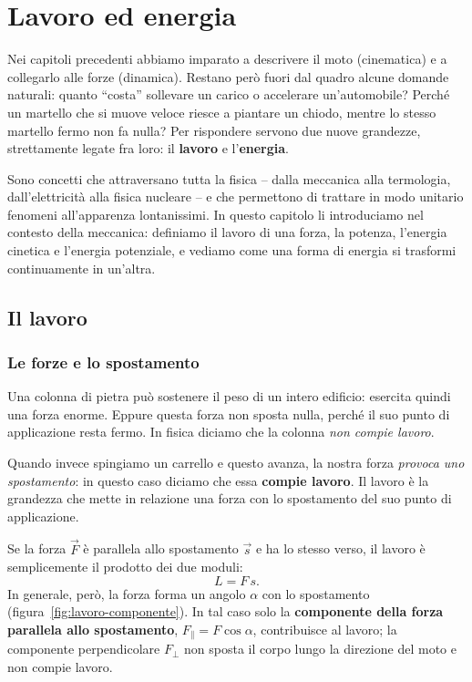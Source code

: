 \chapter{Lavoro ed energia}

Nei capitoli precedenti abbiamo imparato a descrivere il moto (cinematica) e a collegarlo alle forze (dinamica). Restano però fuori dal quadro alcune domande naturali: quanto ``costa'' sollevare un carico o accelerare un'automobile? Perché un martello che si muove veloce riesce a piantare un chiodo, mentre lo stesso martello fermo non fa nulla? Per rispondere servono due nuove grandezze, strettamente legate fra loro: il \textbf{lavoro} e l'\textbf{energia}.

Sono concetti che attraversano tutta la fisica -- dalla meccanica alla termologia, dall'elettricità alla fisica nucleare -- e che permettono di trattare in modo unitario fenomeni all'apparenza lontanissimi. In questo capitolo li introduciamo nel contesto della meccanica: definiamo il lavoro di una forza, la potenza, l'energia cinetica e l'energia potenziale, e vediamo come una forma di energia si trasformi continuamente in un'altra.

\section{Il lavoro}

\subsection{Le forze e lo spostamento}

Una colonna di pietra può sostenere il peso di un intero edificio: esercita quindi una forza enorme. Eppure questa forza non sposta nulla, perché il suo punto di applicazione resta fermo. In fisica diciamo che la colonna \emph{non compie lavoro}.

Quando invece spingiamo un carrello e questo avanza, la nostra forza \emph{provoca uno spostamento}: in questo caso diciamo che essa \textbf{compie lavoro}. Il lavoro è la grandezza che mette in relazione una forza con lo spostamento del suo punto di applicazione.

Se la forza $\vec F$ è parallela allo spostamento $\vec s$ e ha lo stesso verso, il lavoro è semplicemente il prodotto dei due moduli:
\[ L = F\,s. \]
In generale, però, la forza forma un angolo $\alpha$ con lo spostamento (figura~\ref{fig:lavoro-componente}). In tal caso solo la \textbf{componente della forza parallela allo spostamento}, $F_\parallel = F\cos\alpha$, contribuisce al lavoro; la componente perpendicolare $F_\perp$ non sposta il corpo lungo la direzione del moto e non compie lavoro.

